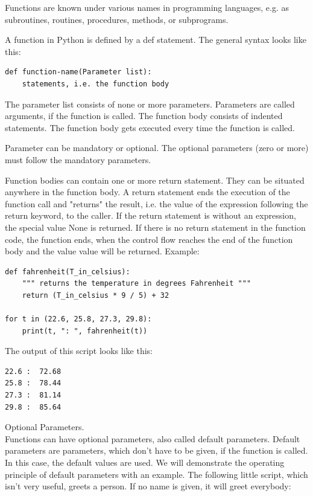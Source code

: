 \documentclass[11pt,a4paper]{article}
\begin{document}
Functions are known under various names in programming languages,
e.g. as subroutines, routines, procedures, methods, or subprograms.

A function in Python is defined by a def statement. The general syntax looks like this:
\begin{lstlisting}
def function-name(Parameter list):
    statements, i.e. the function body
\end{lstlisting}

The parameter list consists of none or more parameters. Parameters are
called arguments, if the function is called. The function body
consists of indented statements. The function body gets executed every
time the function is called.

Parameter can be mandatory or optional. The optional parameters (zero
or more) must follow the mandatory parameters.

Function bodies can contain one or more return statement. They can be
situated anywhere in the function body. A return statement ends the
execution of the function call and "returns" the result, i.e. the
value of the expression following the return keyword, to the
caller. If the return statement is without an expression, the special
value None is returned. If there is no return statement in the
function code, the function ends, when the control flow reaches the
end of the function body and the value value will be returned.
Example:

\begin{lstlisting}
def fahrenheit(T_in_celsius):
    """ returns the temperature in degrees Fahrenheit """
    return (T_in_celsius * 9 / 5) + 32

for t in (22.6, 25.8, 27.3, 29.8):
    print(t, ": ", fahrenheit(t))
\end{lstlisting}

The output of this script looks like this:
\begin{lstlisting}
22.6 :  72.68
25.8 :  78.44
27.3 :  81.14
29.8 :  85.64
\end{lstlisting}

\noindent
Optional Parameters.\\
Functions can have optional parameters, also called default
parameters. Default parameters are parameters, which don't have to be
given, if the function is called. In this case, the default values are
used. We will demonstrate the operating principle of default
parameters with an example. The following little script, which isn't
very useful, greets a person. If no name is given, it will greet
everybody:
\end{document}
